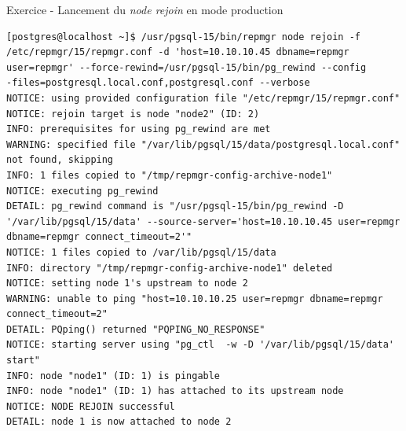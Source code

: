 \begin{frame}[fragile]{Exercice - Lancement du \textit{node rejoin} en mode production}

   \begin{itemize}
\begin{tiny}
\begin{Verbatim}[commandchars=\&\{\}]
[postgres@localhost ~]$ /usr/pgsql-15/bin/repmgr node rejoin -f /etc/repmgr/15/repmgr.conf -d 'host=10.10.10.45 dbname=repmgr user=repmgr' --force-rewind=/usr/pgsql-15/bin/pg_rewind --config
-files=postgresql.local.conf,postgresql.conf --verbose                                         
NOTICE: using provided configuration file "/etc/repmgr/15/repmgr.conf"                         
NOTICE: rejoin target is node "node2" (ID: 2)                                                  
INFO: prerequisites for using pg_rewind are met                                                
WARNING: specified file "/var/lib/pgsql/15/data/postgresql.local.conf" not found, skipping
INFO: 1 files copied to "/tmp/repmgr-config-archive-node1"                                     
NOTICE: executing pg_rewind                    
DETAIL: pg_rewind command is "/usr/pgsql-15/bin/pg_rewind -D '/var/lib/pgsql/15/data' --source-server='host=10.10.10.45 user=repmgr dbname=repmgr connect_timeout=2'"
NOTICE: 1 files copied to /var/lib/pgsql/15/data                                               
INFO: directory "/tmp/repmgr-config-archive-node1" deleted                                     
NOTICE: setting node 1's upstream to node 2    
WARNING: unable to ping "host=10.10.10.25 user=repmgr dbname=repmgr connect_timeout=2"         
DETAIL: PQping() returned "PQPING_NO_RESPONSE"                                                 
NOTICE: starting server using "pg_ctl  -w -D '/var/lib/pgsql/15/data' start"                   
INFO: node "node1" (ID: 1) is pingable         
INFO: node "node1" (ID: 1) has attached to its upstream node                                   
NOTICE: NODE REJOIN successful                 
DETAIL: node 1 is now attached to node 2
\end{Verbatim}
\end{tiny}
   \end{itemize}

\end{frame}


